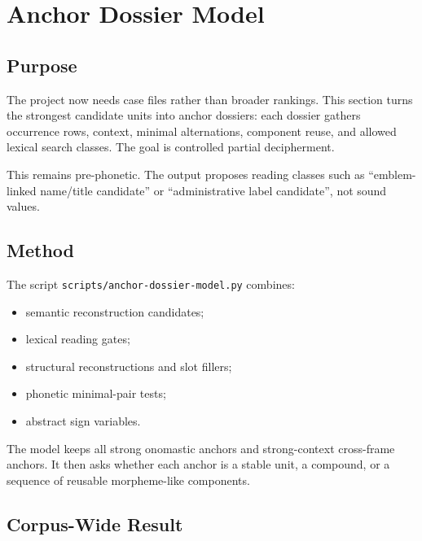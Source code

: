 \section{Anchor Dossier Model}

\subsection{Purpose}

The project now needs case files rather than broader rankings. This section turns the strongest candidate units into anchor dossiers: each dossier gathers occurrence rows, context, minimal alternations, component reuse, and allowed lexical search classes. The goal is controlled partial decipherment.

This remains pre-phonetic. The output proposes reading classes such as ``emblem-linked name/title candidate'' or ``administrative label candidate'', not sound values.

\subsection{Method}

The script \texttt{scripts/anchor-dossier-model.py} combines:

\begin{itemize}
  \item semantic reconstruction candidates;
  \item lexical reading gates;
  \item structural reconstructions and slot fillers;
  \item phonetic minimal-pair tests;
  \item abstract sign variables.
\end{itemize}

The model keeps all strong onomastic anchors and strong-context cross-frame anchors. It then asks whether each anchor is a stable unit, a compound, or a sequence of reusable morpheme-like components.

\subsection{Corpus-Wide Result}

